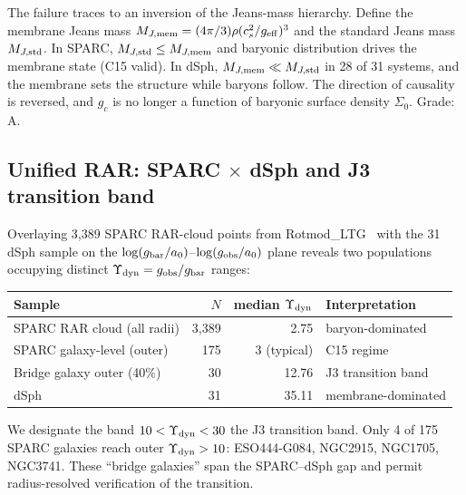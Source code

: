 \documentclass[11pt,a4paper]{article}
\newcommand{\gobs}{g_{\rm obs}}
\newcommand{\gbar}{g_{\rm bar}}
\newcommand{\gc}{g_{c}}
\newcommand{\ao}{a_{0}}
\newcommand{\Ydyn}{\Upsilon_{\rm dyn}}
\newcommand{\Mjmem}{M_{J,{\rm mem}}}
\newcommand{\Mjstd}{M_{J,{\rm std}}}
\begin{document}
The failure traces to an inversion of the Jeans-mass hierarchy. Define the membrane Jeans mass
$\Mjmem = (4\pi/3)\rho(c_s^2/g_{\rm eff})^3$ and the standard Jeans mass $\Mjstd$. In SPARC, $\Mjstd \le
\Mjmem$ and baryonic distribution drives the membrane state (C15 valid). In dSph, $\Mjmem \ll \Mjstd$ in 28
of 31 systems, and the membrane sets the structure while baryons follow. The direction of causality is
reversed, and $\gc$ is no longer a function of baryonic surface density $\Sigma_0$. Grade: A.

\subsection{Unified RAR: SPARC $\times$ dSph and J3 transition band}
Overlaying 3{,}389 SPARC RAR-cloud points from Rotmod\_LTG~\citep{Lelli2016} with the 31 dSph sample on the
$\log(\gbar/\ao)$--$\log(\gobs/\ao)$ plane reveals two populations occupying distinct
$\Ydyn = \gobs/\gbar$ ranges:

\begin{center}\small
\begin{tabular}{@{}lrrl@{}}
\toprule
Sample & $N$ & median $\Ydyn$ & Interpretation \\
\midrule
SPARC RAR cloud (all radii) & 3{,}389 & 2.75 & baryon-dominated \\
SPARC galaxy-level (outer) & 175 & 3 (typical) & C15 regime \\
Bridge galaxy outer (40\%) & 30 & 12.76 & J3 transition band \\
dSph & 31 & 35.11 & membrane-dominated \\
\bottomrule
\end{tabular}
\end{center}

We designate the band $10 < \Ydyn < 30$ the J3 transition band. Only 4 of 175 SPARC galaxies reach outer
$\Ydyn > 10$: ESO444-G084, NGC2915, NGC1705, NGC3741. These ``bridge galaxies'' span the SPARC--dSph gap and
permit radius-resolved verification of the transition.
\end{document}
